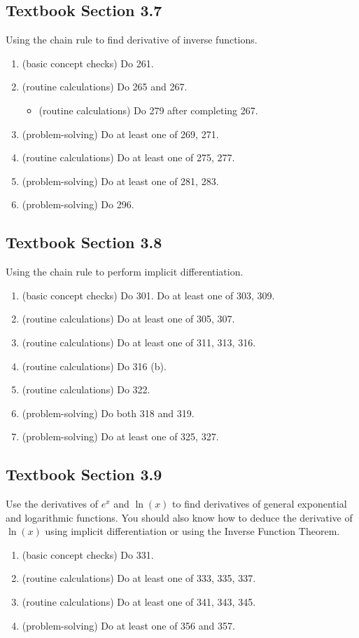 \documentclass[../main.tex]{subfiles}
\begin{document}
\subsection*{Textbook Section 3.7}

Using the chain rule to find derivative of inverse functions.
\begin{enumerate}
  \item (basic concept checks) Do 261.
  \item (routine calculations) Do 265 and 267.
    \begin{itemize}
      \item (routine calculations) Do 279 after completing 267.
    \end{itemize}
  \item (problem-solving) Do at least one of 269, 271.
  \item (routine calculations) Do at least one of 275, 277.
  \item (problem-solving) Do at least one of 281, 283.
  \item (problem-solving) Do 296.
\end{enumerate}

\subsection*{Textbook Section 3.8}

Using the chain rule to perform implicit differentiation.
\begin{enumerate}
  \item (basic concept checks) Do 301. Do at least one of 303, 309.
  \item (routine calculations) Do at least one of 305, 307.
  \item (routine calculations) Do at least one of 311, 313, 316.
  \item (routine calculations) Do 316 (b).
  \item (routine calculations) Do 322.
  \item (problem-solving) Do both 318 and 319.
  \item (problem-solving) Do at least one of 325, 327.
\end{enumerate}
\clearpage

\subsection*{Textbook Section 3.9}

Use the derivatives of \(e^{x}\) and \(\ln(x)\) to find derivatives of general exponential and logarithmic functions.  You should also know how to deduce the derivative of \(\ln(x)\) using implicit differentiation or using the Inverse Function Theorem.
\begin{enumerate}
  \item (basic concept checks) Do 331.
  \item (routine calculations) Do at least one of 333, 335, 337.
  \item (routine calculations) Do at least one of 341, 343, 345.
  \item (problem-solving) Do at least one of 356 and 357.
\end{enumerate}
\end{document}
